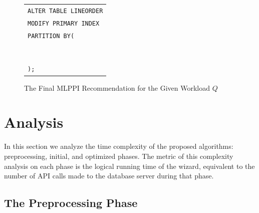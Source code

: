 \documentclass[runningheads]{comsis2}
\begin{document}
\vspace{-.25in}
\begin{figure}[h!]
\begin{center}
\begin{tabular}{|l|} \hline
{\tt ALTER TABLE LINEORDER} \\
{\tt MODIFY PRIMARY INDEX} \\
{\tt PARTITION BY(} \\
\hspace{.1in}{\tt CASE\_N(} \\
	\hspace{.2in}{\tt LO\_DISCOUNT $\geq$ 1 AND LO\_DISCOUNT $\leq$ 5,} \\
	\hspace{.2in}{\tt LO\_DISCOUNT $\geq$ 7,} \\ 
	\hspace{.2in}{\tt NO CASE OR UNKNOWN),} \\
\hspace{.1in}{\tt CASE\_N(} \\
	\hspace{.2in}{\tt LO\_QUANTITY $<$ 25,} \\
	\hspace{.2in}{\tt LO\_QUANTITY $\geq$ 25 AND LO\_QUANTITY $\leq$ 35,} \\
	\hspace{.2in}{\tt NO CASE OR UNKNOWN)} \\ 
{\tt );} \\ \hline
\end{tabular}
\end{center}
\vspace{-.2in}
\caption{The Final MLPPI Recommendation for the Given Workload $Q$\label{fig:mlppi}}
\vspace{-.2in}
\end{figure}

\section{Analysis}
\label{sec:analysis}

In this section we analyze the time complexity of 
the proposed algorithms: preprocessing, initial, and optimized phases. 
The metric of this complexity analysis on each phase is the logical running time of the wizard, 
equivalent to the number of API calls made to the database server during that phase. 

\subsection{The Preprocessing Phase}
\end{document}
